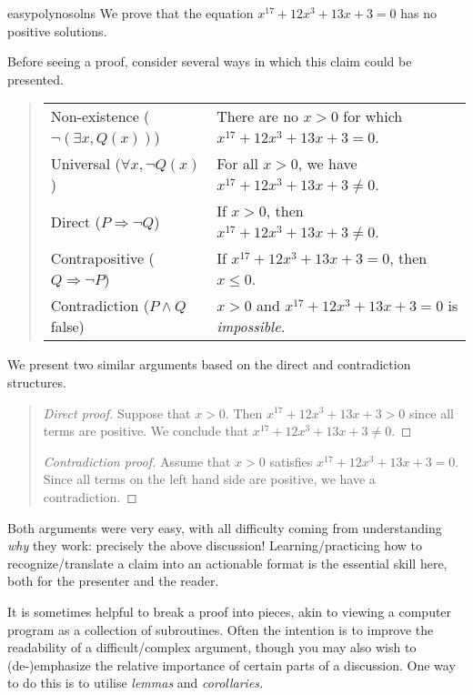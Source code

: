 \begin{example}{}{easypolynosolns}
	We prove that the equation $x^{17}+12x^3+13x+3=0$ has no positive solutions.\medbreak

	Before seeing a proof, consider several ways in which this claim could be presented.
	\begin{quote}
		\def\arraystretch{1.1}
		\begin{tabular}{@{}ll}
			Non-existence ($\neg(\exists x, Q(x))$)& There are no $x>0$ for which $x^{17}+12x^3+13x+3=0$.\\
			Universal ($\forall x,\neg Q(x)$)&For all $x>0$, we have $x^{17}+12x^3+13x+3\neq 0$.\\
			Direct ($P\Rightarrow \neg Q$)&If $x>0$, then $x^{17}+12x^3+13x+3\neq 0$.\\
			Contrapositive ($Q\Rightarrow\neg P$)&If $x^{17}+12x^3+13x+3=0$, then $x\le 0$.\\
			Contradiction ($P\wedge Q$ false)&$x>0$ and $x^{17}+12x^3+13x+3=0$ is \emph{impossible.}
		\end{tabular}
	\end{quote}
	
	We present two similar arguments based on the direct and contradiction structures.  
	
	\begin{quote}
		\begin{proof}[Direct proof]
			Suppose that $x>0$. Then $x^{17}+12x^3+13x+3>0$ since all terms are positive. We conclude that $x^{17}+12x^3+13x+3\neq 0$.
		\end{proof}
		\begin{proof}[Contradiction proof]
			Assume that $x>0$ satisfies $x^{17}+12x^3+13x+3=0$. Since all terms on the left hand side are positive, we have a contradiction.
		\end{proof}
	\end{quote}
	
	Both arguments were very easy, with all difficulty coming from understanding \emph{why} they work: precisely the above discussion! Learning/practicing how to recognize/translate a claim into an actionable format is the essential skill here, both for the presenter and the reader.
\end{example}



It is sometimes helpful to break a proof into pieces, akin to viewing a computer program as a collection of subroutines. Often the intention is to improve the readability of a difficult/complex argument, though you may also wish to (de-)emphasize the relative importance of certain parts of a discussion. One way to do this is to utilise \emph{lemmas} and \emph{corollaries.}

